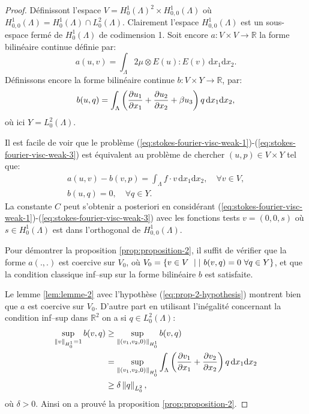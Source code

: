 \begin{proof}
  Définissont l'espace $V = H_0^1(\Lambda)^2\times
  H_{0,0}^1(\Lambda)$ où $H_{0,0}^1(\Lambda) = H_0^1(\Lambda) \cap
  L_0^2(\Lambda)$. Clairement l'espace $H_{0,0}^1(\Lambda)$ est un
  sous-espace fermé de $H_0^1(\Lambda)$ de codimension 1. Soit
  encore $a:V\times V\to \mathbb R$ la forme bilinéaire continue
  définie par:
  \begin{equation}
    a(u,v) = \int_\Lambda 2\mu\otimes E(u):E(v)\,\mathrm dx_1\mathrm dx_2.
  \end{equation}
  Définissons encore la forme bilinéaire continue $b:V\times Y\to\mathbb R$, par:
  \begin{equation}
    b(u, q) = \int_\Lambda \parent{\frac{\partial u_1}{\partial x_1} %
      + \frac{\partial u_2}{\partial x_2} %
      + \beta u_3}q\,\mathrm dx_1\mathrm dx_2,
  \end{equation}
  où ici $Y = L_0^2(\Lambda)$.

  Il est facile de voir que le problème
  (\ref{eq:stokes-fourier-visc-weak-1})-(\ref{eq:stokes-fourier-visc-weak-3})
  est équivalent au problème de chercher $(u,p)\in V\times Y$ tel
  que:
  \begin{equation}
    \begin{split}
      a(u,v) - b(v, p) = \int_\Lambda f\cdot v\,\mathrm dx_1\mathrm dx_2,%
        \quad \forall v\in V,\\
      b(u,q) = 0,%
        \quad \forall q\in Y.
    \end{split}
  \end{equation}
  La constante $C$ peut s'obtenir a posteriori en considérant
  (\ref{eq:stokes-fourier-visc-weak-1})-(\ref{eq:stokes-fourier-visc-weak-3})
  avec les fonctions tests $v = (0,0,s)$ où $s\in H_0^1(\Lambda)$
  est dans l'orthogonal de $H_{0,0}^1(\Lambda)$.

  Pour démontrer la proposition \ref{prop:proposition-2}, il suffit
  de vérifier que la forme $a(.,.)$ est coercive sur $V_0$, où
  $V_0 = \left\{ v\in V\ \mid|\  b(v,q) = 0\ \forall q\in Y \right\}$, et
  que la condition classique inf--sup sur la forme bilinéaire $b$
  est satisfaite.

  Le lemme \ref{lem:lemme-2} avec l'hypothèse
  (\ref{eq:prop-2-hypothesis}) montrent bien que $a$ est coercive sur
  $V_0$. D'autre part en utilisant l'inégalité concernant la
  condition inf--sup dans $\mathbb R^2$ on a si $q\in L_0^2(\Lambda)$:
  \begin{equation}
    \begin{split}
      \sup_{\norm{v}_{H_0^1} = 1}b(v,q) %
      &\geq \sup_{\norm{(v_1, v_2, 0)}_{H_0^1}}b(v,q)\\
      &= \sup_{\norm{(v_1, v_2, 0)}_{H_0^1}}\int_\Lambda \parent{\frac{\partial v_1}{\partial x_1} %
        + \frac{\partial v_2}{\partial x_2}}q\,\mathrm dx_1\mathrm dx_2\\
      &\geq \delta \norm{q}_{L_0^2},
    \end{split}
  \end{equation}
  où $\delta > 0$. Ainsi on a prouvé la proposition \ref{prop:proposition-2}.
\end{proof}

